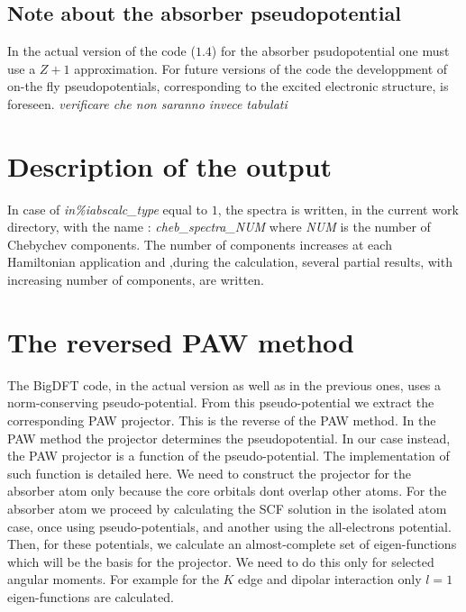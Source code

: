 \documentclass[a4paper,11pt]{report}
\begin{document}
\subsection{Note about the absorber pseudopotential}
 In the actual version of the code ($1.4$) for the absorber
psudopotential one must use a $Z+1$ approximation.
For future versions of the code the developpment of on-the fly
pseudopotentials, corresponding to the excited electronic structure,
is foreseen. {\it verificare che non saranno invece tabulati } 


\section{Description of the output}

In case of  {\it in\%iabscalc\_type} equal to  $1$, the spectra
is written, in the current work directory, with the name :
{\it  cheb\_spectra\_NUM  } where {\it NUM } is the number of 
Chebychev components. The number of components increases
at each Hamiltonian application and ,during the calculation,
 several partial results, with increasing number of components,
 are written.



\section{The reversed PAW method}

The BigDFT code, in the actual version as well as in the previous
ones, uses a norm-conserving pseudo-potential.
From this pseudo-potential we extract the corresponding
PAW projector.
This is the reverse of the PAW method. In the PAW method 
the projector determines the pseudopotential. In our case
instead, the PAW projector is a function of the pseudo-potential.
The implementation of such function is detailed here.
We need to construct the projector for the absorber atom only
because the core orbitals dont overlap other atoms.
For the absorber atom we proceed by calculating 
the SCF solution in the isolated atom case, once using pseudo-potentials,
and another using the all-electrons potential.
Then, for these potentials, we calculate an almost-complete set 
of eigen-functions which will be the basis for the projector.
We need to do this only for selected angular moments.
For example for the $K$ edge and dipolar interaction
only $l=1$ eigen-functions are calculated.
\end{document}
